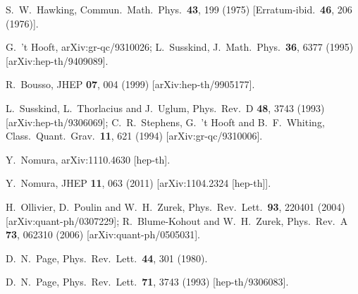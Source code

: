\documentclass[12pt]{article}
\begin{document}
\begin{thebibliography}{99}

S.~W.~Hawking,
Commun.\ Math.\ Phys.\  {\bf 43}, 199 (1975)
[Erratum-ibid.\  {\bf 46}, 206 (1976)].

G.~'t Hooft,
arXiv:gr-qc/9310026;
L.~Susskind,
J.\ Math.\ Phys.\  {\bf 36}, 6377 (1995)
[arXiv:hep-th/9409089].

R.~Bousso,
JHEP {\bf 07}, 004 (1999)
[arXiv:hep-th/9905177].

L.~Susskind, L.~Thorlacius and J.~Uglum,
Phys.\ Rev.\  D {\bf 48}, 3743 (1993)
[arXiv:hep-th/9306069];
C.~R.~Stephens, G.~'t Hooft and B.~F.~Whiting,
Class.\ Quant.\ Grav.\  {\bf 11}, 621 (1994)
[arXiv:gr-qc/9310006].

Y.~Nomura,
arXiv:1110.4630 [hep-th].

Y.~Nomura,
JHEP {\bf 11}, 063 (2011)
[arXiv:1104.2324 [hep-th]].

H.~Ollivier, D.~Poulin and W.~H.~Zurek,
Phys.\ Rev.\ Lett.\ {\bf 93}, 220401 (2004)
[arXiv:quant-ph/0307229];
R.~Blume-Kohout and W.~H.~Zurek,
Phys.\ Rev.\  A {\bf 73}, 062310 (2006)
[arXiv:quant-ph/0505031].

D.~N.~Page,
Phys.\ Rev.\ Lett.\  {\bf 44}, 301 (1980).

D.~N.~Page,
Phys.\ Rev.\ Lett.\  {\bf 71}, 3743 (1993)
[hep-th/9306083].


\end{thebibliography}
\end{document}
